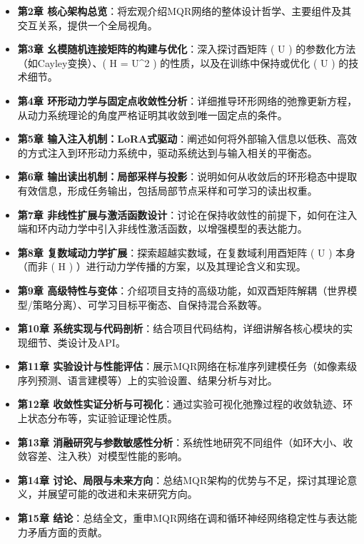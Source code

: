 \documentclass[
  12pt,
]{article}
\providecommand{\tightlist}{%
  \setlength{\itemsep}{0pt}\setlength{\parskip}{0pt}}
\begin{document}
\begin{itemize}
\tightlist
\item
  \textbf{第2章
  核心架构总览}：将宏观介绍MQR网络的整体设计哲学、主要组件及其交互关系，提供一个全局视角。
\item
  \textbf{第3章 幺模随机连接矩阵的构建与优化}：深入探讨酉矩阵 ( U )
  的参数化方法（如Cayley变换）、( H = \textbar U\textbar\^{}2 )
  的性质，以及在训练中保持或优化 ( U ) 的技术细节。
\item
  \textbf{第4章
  环形动力学与固定点收敛性分析}：详细推导环形网络的弛豫更新方程，从动力系统理论的角度严格证明其收敛到唯一固定点的条件。
\item
  \textbf{第5章
  输入注入机制：LoRA式驱动}：阐述如何将外部输入信息以低秩、高效的方式注入到环形动力系统中，驱动系统达到与输入相关的平衡态。
\item
  \textbf{第6章
  输出读出机制：局部采样与投影}：说明如何从收敛后的环形稳态中提取有效信息，形成任务输出，包括局部节点采样和可学习的读出权重。
\item
  \textbf{第7章
  非线性扩展与激活函数设计}：讨论在保持收敛性的前提下，如何在注入端和环内动力学中引入非线性激活函数，以增强模型的表达能力。
\item
  \textbf{第8章 复数域动力学扩展}：探索超越实数域，在复数域利用酉矩阵 (
  U ) 本身（而非 ( H ) ）进行动力学传播的方案，以及其理论含义和实现。
\item
  \textbf{第9章
  高级特性与变体}：介绍项目支持的高级功能，如双酉矩阵解耦（世界模型/策略分离）、可学习目标平衡态、自保持混合系数等。
\item
  \textbf{第10章
  系统实现与代码剖析}：结合项目代码结构，详细讲解各核心模块的实现细节、类设计及API。
\item
  \textbf{第11章
  实验设计与性能评估}：展示MQR网络在标准序列建模任务（如像素级序列预测、语言建模等）上的实验设置、结果分析与对比。
\item
  \textbf{第12章
  收敛性实证分析与可视化}：通过实验可视化弛豫过程的收敛轨迹、环上状态分布等，实证验证理论性质。
\item
  \textbf{第13章
  消融研究与参数敏感性分析}：系统性地研究不同组件（如环大小、收敛容差、注入秩）对模型性能的影响。
\item
  \textbf{第14章
  讨论、局限与未来方向}：总结MQR架构的优势与不足，探讨其理论意义，并展望可能的改进和未来研究方向。
\item
  \textbf{第15章
  结论}：总结全文，重申MQR网络在调和循环神经网络稳定性与表达能力矛盾方面的贡献。
\end{itemize}
\end{document}
